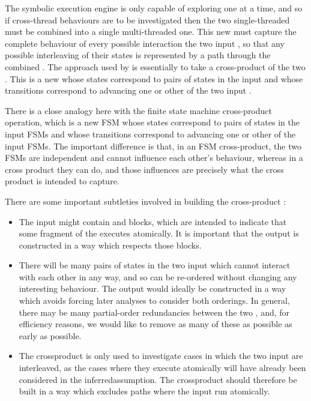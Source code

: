 The symbolic execution engine is only capable of exploring one
{\StateMachine} at a time, and so if cross-thread behaviours are to be
investigated then the two single-threaded {\StateMachines} must be
combined into a single multi-threaded one.  This new {\StateMachine}
must capture the complete behaviour of every possible interaction the
two input {\StateMachines}, so that any possible interleaving of their
states is represented by a path through the combined {\StateMachine}.
The approach used by {\technique} is essentially to take a
cross-product of the two {\StateMachines}.  This is a new
{\StateMachine} whose states correspond to pairs of states in the
input {\StateMachine} and whose transitions correspond to advancing
one or other of the two input {\StateMachines}.

There is a close analogy here with the finite state machine
cross-product operation, which is a new FSM whose states correspond to
pairs of states in the input FSMs and whose transitions correspond to
advancing one or other of the input FSMs.  The important difference is
that, in an FSM cross-product, the two FSMs are independent and cannot
influence each other's behaviour, whereas in a {\StateMachine} cross
product they can do, and those influences are precisely what the cross
product is intended to capture.

There are some important subtleties involved in building the
cross-product {\StateMachine}:

\begin{itemize}
\item The input {\StateMachines} might contain {\stStartAtomic} and
  {\stEndAtomic} blocks, which are intended to indicate that some
  fragment of the {\StateMachine} executes atomically.  It is
  important that the output {\StateMachine} is constructed in a way
  which respects those blocks.
\item There will be many pairs of states in the two input
  {\StateMachines} which cannot interact with each other in any way,
  and so can be re-ordered without changing any interesting behaviour.
  The output {\StateMachine} would ideally be constructed in a way
  which avoids forcing later analyses to consider both orderings.  In
  general, there may be many partial-order redundancies\cite{Alur1997}
  between the two {\StateMachines}, and, for efficiency reasons, we
  would like to remove as many of these as possible as early as
  possible.
\item The \gls{crossproduct} {\StateMachine} is only used to
  investigate cases in which the two input {\StateMachines} are
  interleaved, as the cases where they execute atomically will have
  already been considered in the \gls{inferredassumption}.  The
  \gls{crossproduct} {\StateMachine} should therefore be built in a
  way which excludes paths where the input {\StateMachines} run
  atomically.
\end{itemize}

